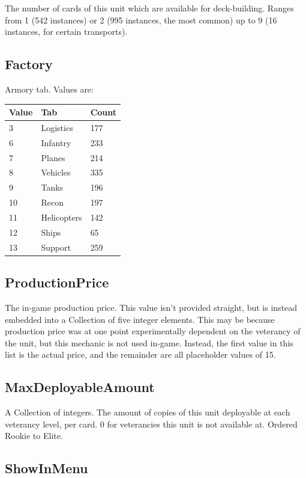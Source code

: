 \documentclass{article}
\begin{document}
The number of cards of this unit which are available for deck-building. Ranges from 1 (542 instances) or 2 (995 instances, the most common) up to 9 (16 instances, for certain transports).

\subsection{Factory}

Armory tab. Values are:

\begin{center}
    \begin{tabular}{ | l | l | l |}
    \hline
	Value & Tab & Count\\ \hline
	3 & Logistics & 177\\
	6 & Infantry & 233\\
	7 & Planes & 214\\
	8 & Vehicles & 335\\
	9 & Tanks & 196\\
	10 & Recon & 197\\
	11 & Helicopters & 142\\
	12 & Ships & 65\\
	13 & Support & 259\\
    \hline
    \end{tabular}
\end{center}

\subsection{ProductionPrice}

The in-game production price. This value isn't provided straight, but is instead embedded into a Collection of five integer elements. This may be because production price was at one point experimentally dependent on the veterancy of the unit, but this mechanic is not used in-game. Instead, the first value in this list is the actual price, and the remainder are all placeholder values of 15.

\subsection{MaxDeployableAmount}

A Collection of integers. The amount of copies of this unit deployable at each veterancy level, per card. 0 for veterancies this unit is not available at. Ordered Rookie to Elite.

\subsection{ShowInMenu}
\end{document}
